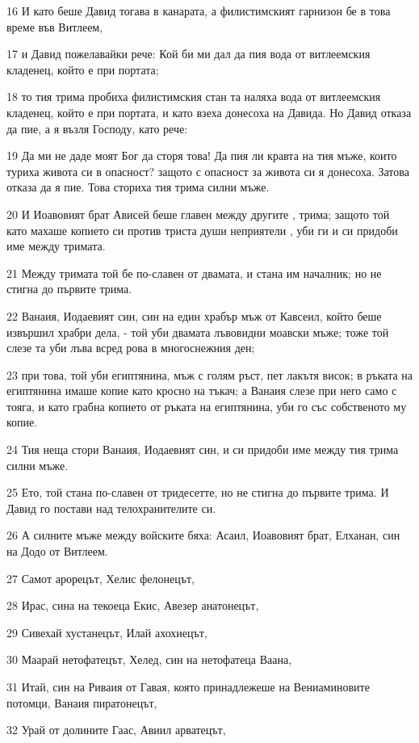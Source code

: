 \par 16 И като беше Давид тогава в канарата, а филистимският гарнизон бе в това време във Витлеем,
\par 17 и Давид пожелавайки рече: Кой би ми дал да пия вода от витлеемския кладенец, който е при портата;
\par 18 то тия трима пробиха филистимския стан та наляха вода от витлеемския кладенец, който е при портата, и като взеха донесоха на Давида. Но Давид отказа да пие, а я възля Господу, като рече:
\par 19 Да ми не даде моят Бог да сторя това! Да пия ли кравта на тия мъже, които туриха живота си в опасност? защото с опасност за живота си я донесоха. Затова отказа да я пие. Това сториха тия трима силни мъже.
\par 20 И Иоавовият брат Ависей беше главен между другите , трима; защото той като махаше копието си против триста души неприятели , уби ги и си придоби име между тримата.
\par 21 Между тримата той бе по-славен от двамата, и стана им началник; но не стигна до първите трима.
\par 22 Ванаия, Иодаевият син, син на един храбър мъж от Кавсеил, който беше извършил храбри дела, - той уби двамата лъвовидни моавски мъже; тоже той слезе та уби лъва всред рова в многоснежния ден;
\par 23 при това, той уби египтянина, мъж с голям ръст, пет лакътя висок; в ръката на египтянина имаше копие като кросно на тъкач; а Ванаия слезе при него само с тояга, и като грабна копието от ръката на египтянина, уби го със собственото му копие.
\par 24 Тия неща стори Ванаия, Иодаевият син, и си придоби име между тия трима силни мъже.
\par 25 Ето, той стана по-славен от тридесетте, но не стигна до първите трима. И Давид го постави над телохранителите си.
\par 26 А силните мъже между войските бяха: Асаил, Иоавовият брат, Елханан, син на Додо от Витлеем.
\par 27 Самот арорецът, Хелис фелонецът,
\par 28 Ирас, сина на текоеца Екис, Авезер анатонецът,
\par 29 Сивехай хустанецът, Илай ахохиецът,
\par 30 Маарай нетофатецът, Хелед, син на нетофатеца Ваана,
\par 31 Итай, син на Риваия от Гавая, която принадлежеше на Вениаминовите потомци, Ванаия пиратонецът,
\par 32 Урай от долините Гаас, Авиил арватецът,
